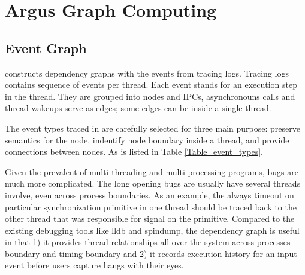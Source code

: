 \section{Argus Graph Computing}

\subsection{Event Graph}

\xxx constructs dependency graphs with the events from tracing logs. Tracing
logs contains sequence of events per thread. Each event stands for an execution
step in the thread. They are grouped into nodes and IPCs, asynchronouns calls
and thread wakeups serve as edges; some edges can be inside a single thread.

The event types traced in \xxx are carefully selected for three main
purpose: preserve semantics for the node, indentify node boundary inside
a thread, and provide connections between nodes. As is listed in Table
\ref{Table_event_types}.

Given the prevalent of multi-threading and multi-processing programs, bugs are
much more complicated. The long opening bugs are usually have several threads
involve, even across process boundaries. As an example, the always timeout on
particular synchronization primitive in one thread should be traced back to the
other thread that was responsible for signal on the primitive. Compared to the
existing debugging tools like lldb and spindump, the dependency graph is useful
in that 1) it provides thread relationships all over the system across processes
boundary and timing boundary and 2) it records execution history for an input
event before users capture hangs with their eyes.

